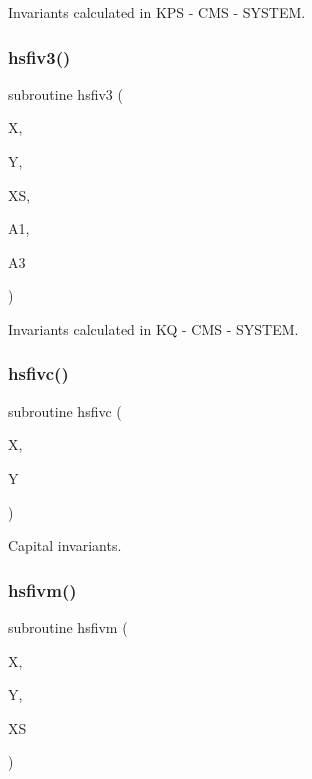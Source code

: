 Invariants calculated in K\+PS -\/ C\+MS -\/ S\+Y\+S\+T\+EM. 

\mbox{\label{djangoh__h_8f_ab499d5121f5e51b92ea25dc130ecc954}} 
\subsubsection{\texorpdfstring{hsfiv3()}{hsfiv3()}}
{\footnotesize\ttfamily subroutine hsfiv3 (\begin{DoxyParamCaption}\item[{}]{X,  }\item[{}]{Y,  }\item[{}]{XS,  }\item[{}]{A1,  }\item[{}]{A3 }\end{DoxyParamCaption})}



Invariants calculated in KQ -\/ C\+MS -\/ S\+Y\+S\+T\+EM. 

\mbox{\label{djangoh__h_8f_a23b8c9868ae8791b60c787b7c9d8f6c2}} 
\subsubsection{\texorpdfstring{hsfivc()}{hsfivc()}}
{\footnotesize\ttfamily subroutine hsfivc (\begin{DoxyParamCaption}\item[{}]{X,  }\item[{}]{Y }\end{DoxyParamCaption})}



Capital invariants. 

\mbox{\label{djangoh__h_8f_ac2ab613f5f604e067429f62b9fcd2e1f}} 
\subsubsection{\texorpdfstring{hsfivm()}{hsfivm()}}
{\footnotesize\ttfamily subroutine hsfivm (\begin{DoxyParamCaption}\item[{}]{X,  }\item[{}]{Y,  }\item[{}]{XS }\end{DoxyParamCaption})}



